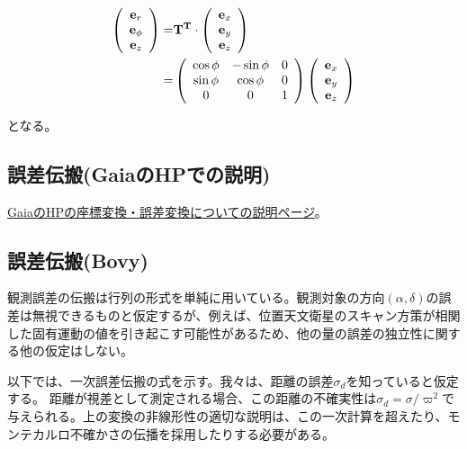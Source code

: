 \begin{align}
\begin{aligned}
    \left(
	\begin{array}{c}
	 	{\bf e}_{r}\\
		{\bf e}_{\phi}\\
		{\bf e}_{z}
	\end{array}
	\right)
	=&
	\bf{T}^T \cdot
	\left(
	\begin{array}{c}
	 	{\bf e}_{x}\\
		{\bf e}_{y}\\
		{\bf e}_{z}
	\end{array}
	\right)\\
	=&
	\left(
	\begin{array}{ccc}
	 	\cos{\phi} & -\sin{\phi} & 0\\
		\sin{\phi} & \cos{\phi} & 0\\
		0 & 0 & 1
	\end{array}
	\right)
	\left(
	\begin{array}{c}
	 	{\bf e}_{x}\\
		{\bf e}_{y}\\
		{\bf e}_{z}
	\end{array}
	\right)
\end{aligned}
\end{align}

となる。





\subsection{誤差伝搬(GaiaのHPでの説明)}

\href{http://gea.esac.esa.int/archive/documentation/GDR2/Data_processing/chap_cu3ast/sec_cu3ast_intro/ssec_cu3ast_intro_tansforms.html}{GaiaのHPの座標変換・誤差変換についての説明ページ}。


\subsection{誤差伝搬(Bovy)}
観測誤差の伝搬は行列の形式を単純に用いている。観測対象の方向$(\alpha,\delta)$の誤差は無視できるものと仮定するが、例えば、位置天文衛星のスキャン方策が相関した固有運動の値を引き起こす可能性があるため、他の量の誤差の独立性に関する他の仮定はしない。

以下では、一次誤差伝搬の式を示す。我々は、距離の誤差$\sigma_d$を知っていると仮定する。 距離が視差として測定される場合、この距離の不確実性は$\sigma_d = \sigma/\varpi^2$で与えられる。上の変換の非線形性の適切な説明は、この一次計算を超えたり、モンテカルロ不確かさの伝播を採用したりする必要がある。

